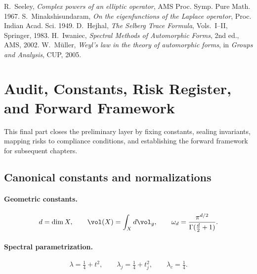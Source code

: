 \begin{thebibliography}{9}
 R.~Seeley, \emph{Complex powers of an elliptic operator}, AMS Proc. Symp. Pure Math. 1967.
 S.~Minakshisundaram, \emph{On the eigenfunctions of the Laplace operator}, Proc. Indian Acad. Sci. 1949.
 D.~Hejhal, \emph{The Selberg Trace Formula}, Vols.~I–II, Springer, 1983.
 H.~Iwaniec, \emph{Spectral Methods of Automorphic Forms}, 2nd ed., AMS, 2002.
 W.~Müller, \emph{Weyl’s law in the theory of automorphic forms}, in \emph{Groups and Analysis}, CUP, 2005.
\end{thebibliography}


\section{Audit, Constants, Risk Register, and Forward Framework}
\label{sec:audit-final}

This final part closes the preliminary layer by fixing constants,
sealing invariants, mapping risks to compliance conditions,
and establishing the forward framework for subsequent chapters.

\subsection{Canonical constants and normalizations}

\paragraph{Geometric constants.}
\[
d = \dim X, 
\qquad \vol(X)=\int_X d\vol_g, 
\qquad \omega_d = \frac{\pi^{d/2}}{\Gamma(\tfrac d2+1)}.
\]

\paragraph{Spectral parametrization.}
\[
\lambda = \tfrac14 + t^2, \qquad 
\lambda_j = \tfrac14 + t_j^2, \qquad 
\lambda_c = \tfrac14.
\]


